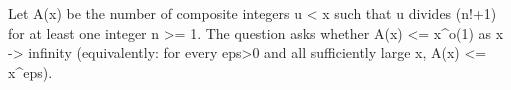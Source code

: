 Let A(x) be the number of composite integers u < x such that u divides (n!+1) for at least one integer n >= 1.
The question asks whether A(x) <= x^{o(1)} as x -> infinity (equivalently: for every eps>0 and all sufficiently large x, A(x) <= x^eps).

